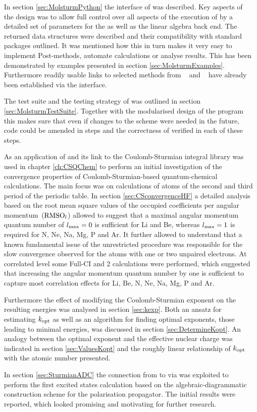 In section \ref{sec:MolsturmPython}
the \python interface of \molsturm was described.
Key aspects of the design
was to allow full control over all aspects
of the execution of \molsturm by a detailed set of parameters
for the \SCF as well as the linear algebra back end.
The returned data structures were described
and their compatibility with standard \python packages outlined.
It was mentioned how this in turn
makes it very easy to implement Post-\HF methods,
automate calculations or analyse results.
This has been demonstrated by examples
presented in section \ref{sec:MolsturmExamples}.
Furthermore
readily usable links to selected methods
from \pyscf~\cite{Sun2017} and \adcman~\cite{Wormit2014}
have already been established via the
\python interface.

The test suite and the testing strategy
of \molsturm was outlined in section \ref{sec:MolsturmTestSuite}.
Together with the modularised design of the program
this makes sure that even if changes to the \SCF scheme
were needed in the future,
code could be amended in steps
and the correctness of \molsturm verified in each of these steps.


As an application of \molsturm and its link to the
Coulomb-Sturmian integral library \sturmint was used
in chapter \ref{ch:CSQChem} to perform an initial investigation
of the convergence properties of Coulomb-Sturmian-based
quantum-chemical calculations.
The main focus was on \HF calculations of atoms
of the second and third period of the periodic table.
In section \ref{sec:CSconvergenceHF}
a detailed analysis based on the root mean square values
of the occupied coefficients per angular momentum~($\text{RMSO}_l$)
allowed to suggest that
a maximal angular momentum quantum number of $l_\text{max} = 0$
is sufficient for Li and Be,
whereas $l_\text{max} = 1$ is required for N, Ne, Na, Mg, P and Ar.
It further allowed to understand that a known fundamental issue of
the unrestricted \HF procedure
was responsible for the slow convergence observed for the
atoms with one or two unpaired electrons.
At correlated level some Full-CI and {\MP}2 calculations
were performed,
which suggested that increasing the angular momentum quantum number
by one is sufficient to capture
most correlation effects for Li, Be, N, Ne, Na, Mg, P and Ar.

Furthermore the effect of modifying the Coulomb-Sturmian
exponent on the resulting \HF energies was analysed in section \ref{sec:kexp}.
Both an ansatz for estimating $k_\text{opt}$ as well as
an algorithm for finding optimal exponents,
\ie those leading to minimal energies,
was discussed in section \ref{sec:DetermineKopt}.
An analogy between the optimal exponent and
the effective nuclear charge was indicated in section \ref{sec:ValuesKopt}
and the roughly
linear relationship of $k_\text{opt}$ with the atomic number presented.

In section \ref{sec:SturmianADC} the connection from
\molsturm to \adcman via \python
was exploited to perform the first
excited states calculation based on the algebraic-diagrammatic construction
scheme for the polarisation propagator.
The initial results were reported,
which looked promising and motivating for further research.
